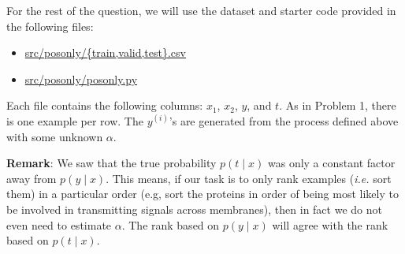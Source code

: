For the rest of the question, we will use the dataset and starter code provided in
the following files:
%
\begin{center}
\begin{itemize}
\item	\url{src/posonly/{train,valid,test}.csv}
\item   \url{src/posonly/posonly.py}
\end{itemize}
\end{center}
%
Each file contains the following columns: $x_1$, $x_2$, $y$, and $t$. As in
Problem 1, there is one example per row. The $y^{(i)}$'s are generated from the process defined above with some unknown $\alpha$.


\begin{enumerate}
        
        \ifnum{} {
	  
        }\fi

        
        \ifnum{} {
	  
        } \fi

        
        \ifnum{} {
	  
        } \fi

	
        \ifnum{} {
	  
        } \fi

	
        \ifnum{} {
	  
        } \fi

	
        \ifnum{} {
	  
        } \fi
\end{enumerate}

\textbf{Remark}: We saw that the true probability $p(t\mid x)$ was only a
constant factor away from $p(y\mid x)$. This means, if our task is to only rank
examples (\emph{i.e.} sort them) in a particular order (e.g, sort the proteins
in order of being most likely to be involved in transmitting signals across
membranes), then in fact we do not even need to estimate $\alpha$. The rank
based on $p(y\mid x)$ will agree with the rank based on $p(t\mid x)$.
